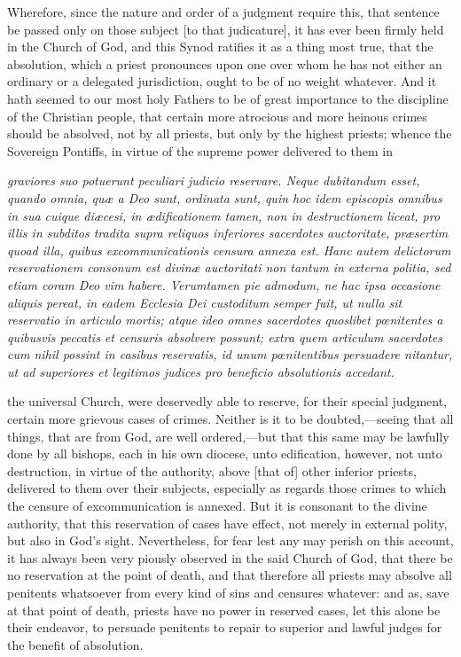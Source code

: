 Wherefore, since the nature and order of a judgment require this, that sentence be passed only on those subject [to that judicature], it has ever been firmly held in the Church of God, and this Synod ratifies it as a thing most true, that the absolution, which a priest pronounces upon one over whom he has not either an ordinary or a delegated jurisdiction, ought to be of no weight whatever. And it hath seemed to our most holy Fathers to be of great importance to the discipline of the Christian people, that certain more atrocious and more heinous crimes should be absolved, not by all priests, but only by the highest priests; whence the Sovereign Pontiffs, in virtue of the supreme power delivered to them in

\emph{graviores suo potuerunt peculiari judicio reservare. Neque dubitandum esset, quando omnia, quæ a Deo sunt, ordinata sunt, quin hoc idem episcopis omnibus in sua cuique diæcesi, in ædificationem tamen, non in destructionem liceat, pro illis in subditos tradita supra reliquos inferiores sacerdotes auctoritate, præsertim quoad illa, quibus excommunicationis censura annexa est. Hanc autem delictorum reservationem consonum est divinæ auctoritati non tantum in externa politia, sed etiam coram Deo vim habere. Verumtamen pie admodum, ne hac ipsa occasione aliquis pereat, in eadem Ecclesia Dei custoditum semper fuit, ut nulla sit reservatio in articulo mortis; atque ideo omnes sacerdotes quoslibet pœnitentes a quibusvis peccatis et censuris absolvere possunt; extra quem articulum sacerdotes cum nihil possint in casibus reservatis, id unum pœnitentibus persuadere nitantur, ut ad superiores et legitimos judices pro beneficio absolutionis accedant.}

the universal Church, were deservedly able to reserve, for their special judgment, certain more grievous cases of crimes. Neither is it to be doubted,—seeing that all things, that are from God, are well ordered,—but that this same may be lawfully done by all bishops, each in his own diocese, unto edification, however, not unto destruction, in virtue of the authority, above [that of] other inferior priests, delivered to them over their subjects, especially as regards those crimes to which the censure of excommunication is annexed. But it is consonant to the divine authority, that this reservation of cases have effect, not merely in external polity, but also in God's sight. Nevertheless, for fear lest any may perish on this account, it has always been very piously observed in the said Church of God, that there be no reservation at the point of death, and that therefore all priests may absolve all penitents whatsoever from every kind of sins and censures whatever: and as, save at that point of death, priests have no power in reserved cases, let this alone be their endeavor, to persuade penitents to repair to superior and lawful judges for the benefit of absolution.

